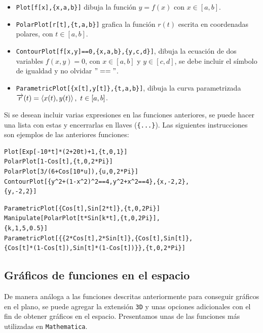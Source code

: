         \begin{itemize}
          \item \verb"Plot[f[x],{x,a,b}]" dibuja la función $y=f(x)$ con $x \in[a,b]$. 
          \item \verb"PolarPlot[r[t],{t,a,b}]" grafica la función $r(t)$ escrita en coordenadas polares, con $t \in[a,b]$.
          \item \verb"ContourPlot[f[x,y]==0,{x,a,b},{y,c,d}]",
            dibuja la ecuación de dos variables $f(x,y)=0$, con $x \in[a,b]$ y $y \in[c,d]$,
            se debe incluir el símbolo de igualdad y no olvidar $"=="$.
          \item \verb"ParametricPlot[{x[t],y[t]},{t,a,b}]", dibuja la curva parametrizada
          $\overrightarrow{r}(t)=\left\langle x(t),y(t)\right\rangle ,\,\, t\in \lbrack a,b]$.
      \end{itemize}
      Si se desean incluir varias expresiones en las funciones anteriores,
      se puede hacer una lista con estas y encerrarlas en llaves (\verb"{...}").
      Las siguientes instrucciones son ejemplos de las anteriores funciones:

      \begin{tcolorbox}[title=Algunos gráficos en el plano]
\begin{Verbatim}
Plot[Exp[-10*t]*(2+20t)+1,{t,0,1}]
PolarPlot[1-Cos[t],{t,0,2*Pi}]
PolarPlot[3/(6+Cos[10*u]),{u,0,2*Pi}]
ContourPlot[{y^2+(1-x^2)^2==4,y^2+x^2==4},{x,-2,2},
{y,-2,2}]
\end{Verbatim}
\begin{Verbatim}
ParametricPlot[{Cos[t],Sin[2*t]},{t,0,2Pi}]
Manipulate[PolarPlot[t*Sin[k*t],{t,0,2Pi}],
{k,1,5,0.5}]
ParametricPlot[{{2*Cos[t],2*Sin[t]},{Cos[t],Sin[t]},
{Cos[t]*(1-Cos[t]),Sin[t]*(1-Cos[t])}},{t,0,2*Pi}]
\end{Verbatim}
      \end{tcolorbox}

      \subsection{Gráficos de funciones en el espacio}
      De manera análoga a las funciones descritas anteriormente para
      conseguir gráficos en el plano, se puede agregar la extensión \verb"3D" y unas opciones adicionales
      con el fin de obtener gráficos en el espacio.
      Presentamos unas de las funciones más utilizadas en  \verb"Mathematica".

